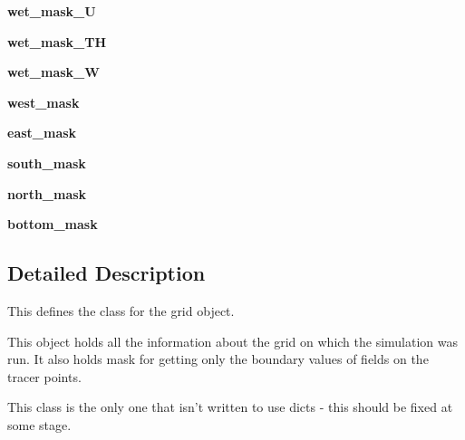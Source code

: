 \begin{DoxyCompactItemize}
\item 
\hypertarget{classmitgcm_1_1Grid_a8d1e6b6d57d4436359e541a6d9194f8a}{}{\bfseries wet\+\_\+mask\+\_\+\+U}\label{classmitgcm_1_1Grid_a8d1e6b6d57d4436359e541a6d9194f8a}

\item 
\hypertarget{classmitgcm_1_1Grid_a16b1b6c702225deabdd91158519ab995}{}{\bfseries wet\+\_\+mask\+\_\+\+T\+H}\label{classmitgcm_1_1Grid_a16b1b6c702225deabdd91158519ab995}

\item 
\hypertarget{classmitgcm_1_1Grid_abc2c452fd0f9517cb367753d770cedc8}{}{\bfseries wet\+\_\+mask\+\_\+\+W}\label{classmitgcm_1_1Grid_abc2c452fd0f9517cb367753d770cedc8}

\item 
\hypertarget{classmitgcm_1_1Grid_a5eac0a84e017258009fe0b7ba70bc1f2}{}{\bfseries west\+\_\+mask}\label{classmitgcm_1_1Grid_a5eac0a84e017258009fe0b7ba70bc1f2}

\item 
\hypertarget{classmitgcm_1_1Grid_ad74c22eaba4deda8306c949fa271174a}{}{\bfseries east\+\_\+mask}\label{classmitgcm_1_1Grid_ad74c22eaba4deda8306c949fa271174a}

\item 
\hypertarget{classmitgcm_1_1Grid_a27561fff6893f32c2ad90970b2badecc}{}{\bfseries south\+\_\+mask}\label{classmitgcm_1_1Grid_a27561fff6893f32c2ad90970b2badecc}

\item 
\hypertarget{classmitgcm_1_1Grid_a344c1302a51ca394607b51e738df20e3}{}{\bfseries north\+\_\+mask}\label{classmitgcm_1_1Grid_a344c1302a51ca394607b51e738df20e3}

\item 
\hypertarget{classmitgcm_1_1Grid_a452b6e3a03a8e83b3273963dc0ddc9d8}{}{\bfseries bottom\+\_\+mask}\label{classmitgcm_1_1Grid_a452b6e3a03a8e83b3273963dc0ddc9d8}

\end{DoxyCompactItemize}


\subsection{Detailed Description}
This defines the class for the grid object. 

This object holds all the information about the grid on which the simulation was run. It also holds mask for getting only the boundary values of fields on the tracer points. \begin{DoxyVerb}This class is the only one that isn't written to use dicts - this should be fixed at some stage. \end{DoxyVerb}
 

